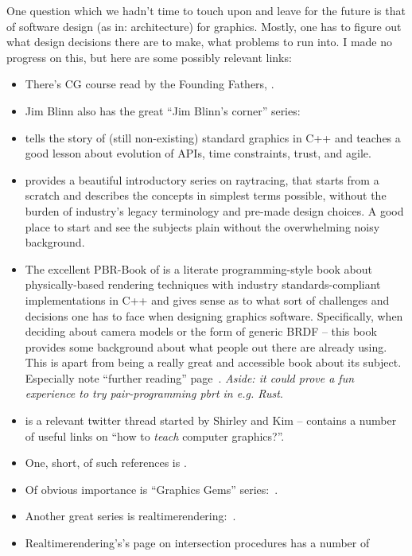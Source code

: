 One question which we hadn't time to touch upon and leave for the future is
that of software design (as in: architecture) for graphics.
Mostly, one has to figure out what design decisions there are to make,
what problems to run into. I made no progress on this, but here are some
possibly relevant links:
\begin{itemize}
\item There's CG course read by the Founding Fathers, \citet{blinnCatmullCG}.
\item Jim Blinn also has the great ``Jim Blinn's corner'' series:
\citet{jimTripPipeline,jimDirtyPixels,jimDirtyPixels}
\item \citet{sg13ApiFailed} tells the story of (still non-existing) standard
graphics in C++ and teaches a good lesson about evolution of APIs, time
constraints, trust, and agile.
\item \citet{shirleyRTWeekend} provides a beautiful introductory series on
raytracing, that starts from a scratch and describes the concepts in simplest
terms possible, without the burden of industry's legacy terminology and
pre-made design choices. A good place to start and see the subjects plain
without the overwhelming noisy background.
\item The excellent PBR-Book of \citet{pbrBook} is a literate
programming-style book about physically-based rendering techniques with industry
standards-compliant implementations in C++ and gives sense as to what sort of
challenges and decisions one has to face when designing graphics software.
Specifically, when deciding about camera models or the form of
generic BRDF -- this book provides some background about what people out there
are already using. This is apart from being a really great and accessible book
about its subject. Especially note ``further reading'' page~\cite{pbrBookReading}.
\emph{Aside: it could prove a fun experience to try pair-programming pbrt in
e.g. Rust}.
\item \cite{shirleyKimTeaching} is a relevant twitter thread started by Shirley
and Kim -- contains a number of useful links on ``how to \emph{teach} computer
graphics?''.
\item One, short, of such references is \citet{texnh}.
\item Of obvious importance is ``Graphics Gems'' series:~\citet{graphicsGems}.
\item Another great series is realtimerendering:~\citet{RTR4}.
\item Realtimerendering's's page on intersection procedures has a number of

\end{itemize}

